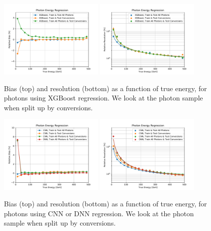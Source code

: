 \begin{figure}[htbp]
\centering
\includegraphics[width=0.45\textwidth]{Images/Calo/bias_vs_E_GammaFixed_xgb_convs.pdf}
\includegraphics[width=0.45\textwidth]{Images/Calo/res_vs_E_GammaFixed_xgb_convs_fits.pdf}
\caption{Bias (top) and resolution (bottom) as a function of true energy, for photons using XGBoost regression.  We look at the photon sample when split up by conversions.
}
\label{fig:reg_xgb_conv_gamma}
\end{figure}

\begin{figure}[htbp]
\centering
\includegraphics[width=0.45\textwidth]{Images/Calo/bias_vs_E_GammaFixed_nn_convs.pdf}
\includegraphics[width=0.45\textwidth]{Images/Calo/res_vs_E_GammaFixed_nn_convs_fits.pdf}
\caption{Bias (top) and resolution (bottom) as a function of true energy, for photons using CNN or DNN regression.  We look at the photon sample when split up by conversions.
}
\label{fig:reg_nn_conv_gamma}
\end{figure}

